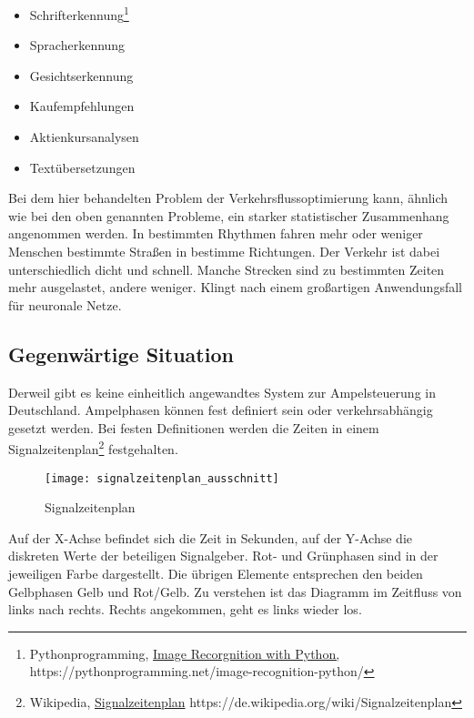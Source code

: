 \begin{multicols}{2}
\begin{itemize}
    \item Schrifterkennung\footnote{Pythonprogramming, \href{https://pythonprogramming.net/image-recognition-python/}{Image Recorgnition with Python,}\\https://pythonprogramming.net/image-recognition-python/} %
  \item Spracherkennung
  \item Gesichtserkennung
  \item Kaufempfehlungen
  \item Aktienkursanalysen
  \item Textübersetzungen
\end{itemize}
\end{multicols}

Bei dem hier behandelten Problem der Verkehrsflussoptimierung kann, ähnlich wie bei den oben genannten Probleme, ein starker statistischer Zusammenhang angenommen werden. In bestimmten Rhythmen fahren mehr oder weniger Menschen bestimmte Straßen in bestimme Richtungen. Der Verkehr ist dabei unterschiedlich dicht und schnell. Manche Strecken sind zu bestimmten Zeiten mehr ausgelastet, andere weniger. Klingt nach einem großartigen Anwendungsfall für neuronale Netze.

\subsection{Gegenwärtige Situation}

Derweil gibt es keine einheitlich angewandtes System zur Ampelsteuerung in Deutschland. Ampelphasen können fest definiert sein oder verkehrsabhängig gesetzt werden. Bei festen Definitionen werden die Zeiten in einem Signalzeitenplan\footnote{Wikipedia, \href{https://de.wikipedia.org/wiki/Signalzeitenplan}{Signalzeitenplan} https://de.wikipedia.org/wiki/Signalzeitenplan} festgehalten.

\begin{figure}[H]
    \centering
    \texttt{[image: signalzeitenplan\_ausschnitt]}
    \caption{Signalzeitenplan}
    \label{fig:signalzeitenplan}
\end{figure}

Auf der X-Achse befindet sich die Zeit in Sekunden, auf der Y-Achse die diskreten Werte der beteiligen Signalgeber. Rot- und Grünphasen sind in der jeweiligen Farbe dargestellt. Die übrigen Elemente entsprechen den beiden Gelbphasen Gelb und Rot/Gelb. Zu verstehen ist das Diagramm im Zeitfluss von links nach rechts. Rechts angekommen, geht es links wieder los.

